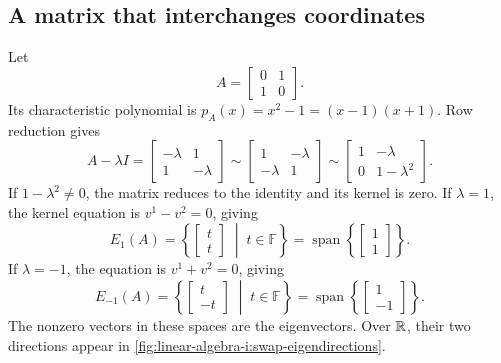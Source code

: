 \subsection{A matrix that interchanges coordinates}

\begin{example}
  \label{ex:linear-algebra-i:coordinate-swap-eigenspaces}
  Let
  \[
    A=\begin{bmatrix}0&1\\1&0\end{bmatrix}.
  \]
  Its characteristic polynomial is
  \(p_A(x)=x^2-1=(x-1)(x+1)\). Row reduction gives
  \[
    A-\lambda I=
    \begin{bmatrix}-\lambda&1\\1&-\lambda\end{bmatrix}
    \sim\begin{bmatrix}1&-\lambda\\-\lambda&1\end{bmatrix}
    \sim\begin{bmatrix}1&-\lambda\\0&1-\lambda^2\end{bmatrix}.
  \]
  If \(1-\lambda^2\ne0\), the matrix reduces to the identity and its
  kernel is zero. If \(\lambda=1\), the kernel equation is
  \(v^1-v^2=0\), giving
  \[
    E_1(A)=\left\{\begin{bmatrix}t\\t\end{bmatrix}\;\middle|\;t\in\mathbb F\right\}
      =\operatorname{span}\left\{\begin{bmatrix}1\\1\end{bmatrix}\right\}.
  \]
  If \(\lambda=-1\), the equation is \(v^1+v^2=0\), giving
  \[
    E_{-1}(A)=\left\{\begin{bmatrix}t\\-t\end{bmatrix}\;\middle|\;t\in\mathbb F\right\}
      =\operatorname{span}\left\{\begin{bmatrix}1\\-1\end{bmatrix}\right\}.
  \]
  The nonzero vectors in these spaces are the eigenvectors.
  Over \(\mathbb{R}\), their two directions appear in
  \autoref{fig:linear-algebra-i:swap-eigendirections}.
  \begin{marginfigure}
    \centering
    
    \caption[Eigendirections of the coordinate swap]{The map
      \(A(x,y)=(y,x)\) fixes the line \(E_1\) and reverses vectors on
      \(E_{-1}\). Here \(v=(1,1)\), \(w=(1,-1)\), and \(Aw=-w\).}
    \label{fig:linear-algebra-i:swap-eigendirections}
  \end{marginfigure}
\end{example}

